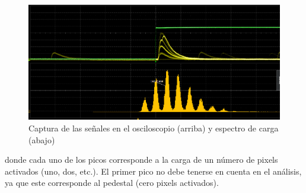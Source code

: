 \begin{figure}[hbtp]
 \centering
 \includegraphics[scale=0.4]{Analisis.png}
 \caption{Captura de las señales en el osciloscopio (arriba) y espectro de carga (abajo)\label{analisis}}
 \end{figure}
donde cada uno de los picos corresponde a la carga de un número de pixels activados (uno, dos, etc.). El primer pico no debe tenerse en cuenta en el análisis, ya que este corresponde al pedestal (cero pixels activados).
 
